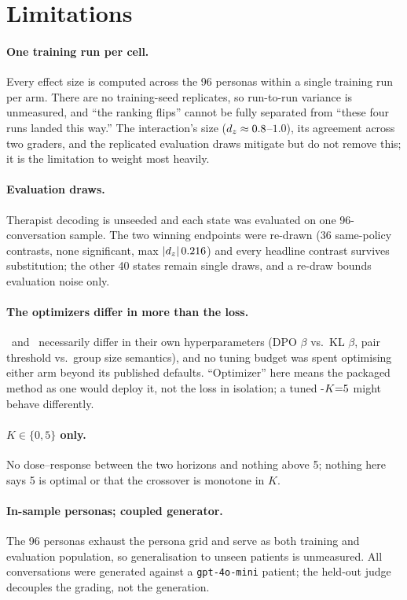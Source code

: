 \section*{Limitations}
\label{sec:limitations}

\paragraph{One training run per cell.} Every effect size is computed across the 96 personas
within a single training run per arm. There are no training-seed replicates, so run-to-run
variance is unmeasured, and ``the ranking flips'' cannot be fully separated from ``these four
runs landed this way.'' The interaction's size ($d_z \approx 0.8$--$1.0$), its agreement across
two graders, and the replicated evaluation draws mitigate but do not remove this; it is the
limitation to weight most heavily.

\paragraph{Evaluation draws.} Therapist decoding is unseeded and each state was evaluated on one
96-conversation sample. The two winning endpoints were re-drawn (36 same-policy contrasts, none
significant, max $|d_z|\,0.216$) and every headline contrast survives substitution; the other 40
states remain single draws, and a re-draw bounds evaluation noise only.

\paragraph{The optimizers differ in more than the loss.} \PTO\ and \GRPO\ necessarily differ in
their own hyperparameters (DPO $\beta$ vs.\ KL $\beta$, pair threshold vs.\ group size
semantics), and no tuning budget was spent optimising either arm beyond its published defaults.
``Optimizer'' here means the packaged method as one would deploy it, not the loss in isolation;
a tuned \PTO-$K{=}5$ might behave differently.

\paragraph{$K \in \{0, 5\}$ only.} No dose--response between the two horizons and nothing above
5; nothing here says 5 is optimal or that the crossover is monotone in $K$.

\paragraph{In-sample personas; coupled generator.} The 96 personas exhaust the persona grid and
serve as both training and evaluation population, so generalisation to unseen patients is
unmeasured. All conversations were generated against a \texttt{gpt-4o-mini} patient; the held-out
judge decouples the grading, not the generation.

